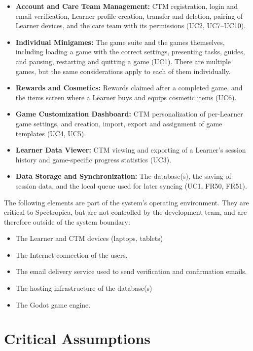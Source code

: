 \documentclass{article}
\begin{document}
\begin{itemize}
    \item \textbf{Account and Care Team Management:} CTM registration, login and email verification, Learner profile creation, transfer and deletion, pairing of Learner devices, and the care team with its permissions (UC2, UC7--UC10).
    \item \textbf{Individual Minigames:} The game suite and the games themselves, including loading a game with the correct settings, presenting tasks, guides, and pausing, restarting and quitting a game (UC1). There are multiple games, but the same considerations apply to each of them individually.
    \item \textbf{Rewards and Cosmetics:} Rewards claimed after a completed game, and the items screen where a Learner buys and equips cosmetic items (UC6).
    \item \textbf{Game Customization Dashboard:} CTM personalization of per-Learner game settings, and creation, import, export and assignment of game templates (UC4, UC5).
    \item \textbf{Learner Data Viewer:} CTM viewing and exporting of a Learner's session history and game-specific progress statistics (UC3).
    \item \textbf{Data Storage and Synchronization:} The database(s), the saving of session data, and the local queue used for later syncing (UC1, FR50, FR51).
\end{itemize}

The following elements are part of the system's operating environment. They are critical to Spectropica, but are not controlled by the development team, and are therefore outside of the system boundary:

\begin{itemize}
    \item The Learner and CTM devices (laptops, tablets)
    \item The Internet connection of the users.
    \item The email delivery service used to send verification and confirmation emails.
    \item The hosting infrastructure of the database(s)
    \item The Godot game engine.
\end{itemize}

\section{Critical Assumptions}
\end{document}
